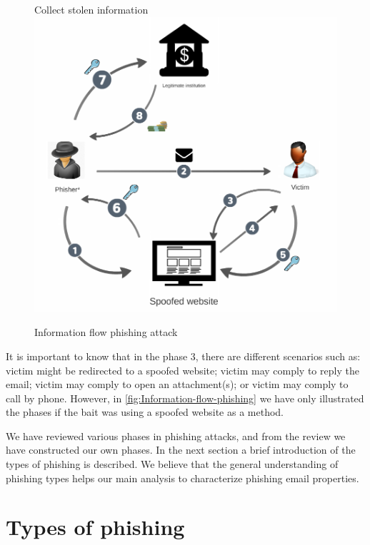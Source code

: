 \begin{figure}
\centering{}Collect stolen information \includegraphics[scale=0.3]{gfx/info-flow-nolie}\protect\caption{\label{fig:Information-flow-phishing}Information flow phishing attack}
\end{figure}


It is important to know that in the phase 3, there are different scenarios
such as: victim might be redirected to a spoofed website; victim may
comply to reply the email; victim may comply to open an attachment(s);
or victim may comply to call by phone. However, in \autoref{fig:Information-flow-phishing}
we have only illustrated the phases if the bait was using a spoofed
website as a method. 

We have reviewed various phases in phishing attacks, and from the
review we have constructed our own phases. In the next section a brief
introduction of the types of phishing is described. We believe that
the general understanding of phishing types helps our main analysis
to characterize phishing email properties.


\section{Types of phishing}

